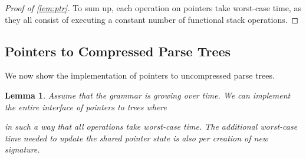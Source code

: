 \documentclass[a4paper]{article}
\newtheorem{lemma}[theorem]{Lemma}
\theoremstyle{remark}
\begin{document}
\begin{proof}[Proof of \cref{lem:ptr}]
To sum up, each operation on pointers take worst-case  time, as they
all consist of executing a constant number of functional stack operations.
\end{proof}

\subsection{Pointers to Compressed Parse Trees}
We now show the implementation of pointers to uncompressed parse trees.

\begin{lemma}\label{lem:uptr}
Assume that the grammar  is growing over time.
We can implement the entire interface of pointers to trees  where

in such a way that all operations take  worst-case time.
The additional worst-case time needed to update the shared pointer state is also  per creation of new signature.
\end{lemma}
\end{document}

